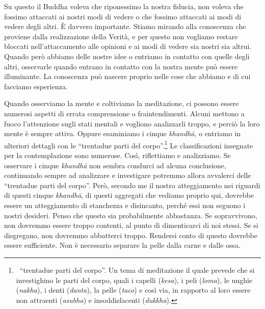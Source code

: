 Su questo il Buddha voleva che riponessimo la nostra fiducia, non voleva
che fossimo attaccati ai nostri modi di vedere o che fossimo attaccati
ai modi di vedere degli altri. È davvero importante. Stiamo mirando alla
conoscenza che proviene dalla realizzazione della Verità, e per questo
non vogliamo restare bloccati nell'attaccamento alle opinioni e ai modi
di vedere sia nostri sia altrui. Quando però abbiamo delle nostre idee o
entriamo in contatto con quelle degli altri, osservarle quando entrano
in contatto con la nostra mente può essere illuminante. La conoscenza
può nascere proprio nelle cose che abbiamo e di cui facciamo esperienza.

Quando osserviamo la mente e coltiviamo la meditazione, ci possono
essere numerosi aspetti di errata comprensione o fraintendimenti. Alcuni
mettono a fuoco l'attenzione sugli stati mentali e vogliono analizzarli
troppo, e perciò la loro mente è sempre attiva. Oppure esaminiamo i
cinque \emph{khandhā}, o entriamo in ulteriori dettagli con le
``trentadue parti del corpo''.\footnote{~``trentadue parti del corpo''.
  Un tema di meditazione il quale prevede che si investighino le parti
  del corpo, quali i capelli (\emph{kesa}), i peli (\emph{loma}), le
  unghie (\emph{nakha}), i denti (\emph{danta}), la pelle (\emph{taco})
  e così via, in rapporto al loro essere non attraenti (\emph{asubha}) e
  insoddisfacenti (\emph{dukkha}).} Le classificazioni insegnate per la
contemplazione sono numerose. Così, riflettiamo e analizziamo. Se
osservare i cinque \emph{khandhā} non sembra condurci ad alcuna
conclusione, continuando sempre ad analizzare e investigare potremmo
allora avvalerci delle ``trentadue parti del corpo''. Però, secondo me
il nostro atteggiamento nei riguardi di questi cinque \emph{khandhā}, di
questi aggregati che vediamo proprio qui, dovrebbe essere un
atteggiamento di stanchezza e disincanto, perché essi non seguono i
nostri desideri. Penso che questo sia probabilmente abbastanza. Se
sopravvivono, non dovremmo essere troppo contenti, al punto di
dimenticarci di noi stessi. Se si disgregano, non dovremmo abbatterci
troppo. Rendersi conto di questo dovrebbe essere sufficiente. Non è
necessario separare la pelle dalla carne e dalle ossa.


